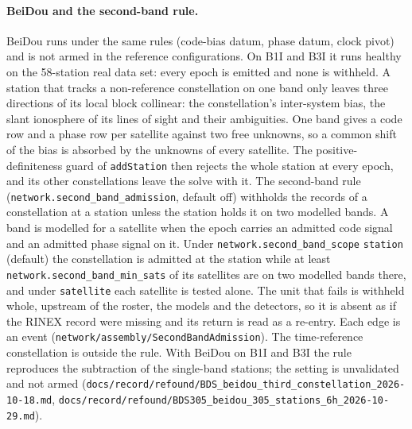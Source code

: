 \documentclass[main.tex]{subfiles}
\begin{document}
\paragraph{BeiDou and the second-band rule.}
BeiDou runs under the same rules (code-bias datum, phase datum, clock
pivot) and is not armed in the reference configurations. On B1I and B3I
it runs healthy on the 58-station real data set: every epoch is emitted
and none is withheld. A station that
tracks a non-reference constellation on one band only leaves three
directions of its local block collinear: the constellation's
inter-system bias, the slant ionosphere of its lines of sight and their
ambiguities. One band gives a code row and a phase row per satellite
against two free unknowns, so a common shift of the bias is absorbed by
the unknowns of every satellite. The positive-definiteness guard of
\texttt{addStation} then rejects the whole station at every epoch, and
its other constellations leave the solve with it. The second-band rule
(\texttt{network.second\_band\_admission}, default off) withholds the
records of a constellation at a station unless the station holds it on
two modelled bands. A band is modelled for a satellite when the epoch
carries an admitted code signal and an admitted phase signal on it. Under
\texttt{network.second\_band\_scope} \texttt{station} (default) the
constellation is admitted at the station while at least
\texttt{network.second\_band\_min\_sats} of its satellites are on two
modelled bands there, and under \texttt{satellite} each satellite is
tested alone. The unit that fails is withheld whole, upstream of the
roster, the models and the detectors, so it is absent as if the RINEX
record were missing and its return is read as a re-entry. Each edge is an
event (\texttt{network/assembly/SecondBandAdmission}). The time-reference
constellation is outside the rule. With BeiDou on B1I and B3I the rule
reproduces the subtraction of the single-band stations; the setting is
unvalidated and not armed
(\texttt{docs/record/refound/BDS\_beidou\_third\_constellation\_2026-10-18.md},
\texttt{docs/record/refound/BDS305\_beidou\_305\_stations\_6h\_2026-10-29.md}).
\end{document}
